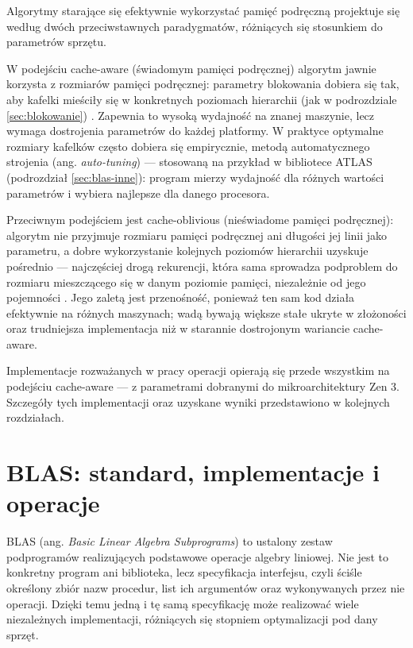 \documentclass[a4paper,12pt]{book} %
\begin{document}
Algorytmy starające się efektywnie wykorzystać pamięć podręczną projektuje się według dwóch przeciwstawnych paradygmatów, różniących się stosunkiem do parametrów sprzętu.

W podejściu cache-aware (świadomym pamięci podręcznej) algorytm jawnie korzysta z rozmiarów pamięci podręcznej: parametry blokowania dobiera się tak, aby kafelki mieściły się w konkretnych poziomach hierarchii (jak w podrozdziale \ref{sec:blokowanie}) \cite{goto2008anatomy}. Zapewnia to wysoką wydajność na znanej maszynie, lecz wymaga dostrojenia parametrów do każdej platformy. W praktyce optymalne rozmiary kafelków często dobiera się empirycznie, metodą automatycznego strojenia (ang. \emph{auto-tuning}) --- stosowaną na przykład w bibliotece ATLAS \cite{whaley2001atlas} (podrozdział \ref{sec:blas-inne}): program mierzy wydajność dla różnych wartości parametrów i wybiera najlepsze dla danego procesora.

Przeciwnym podejściem jest cache-oblivious (nieświadome pamięci podręcznej): algorytm nie przyjmuje rozmiaru pamięci podręcznej ani długości jej linii jako parametru, a dobre wykorzystanie kolejnych poziomów hierarchii uzyskuje pośrednio --- najczęściej drogą rekurencji, która sama sprowadza podproblem do rozmiaru mieszczącego się w danym poziomie pamięci, niezależnie od jego pojemności \cite{frigo1999cacheoblivious}. Jego zaletą jest przenośność, ponieważ ten sam kod działa efektywnie na różnych maszynach; wadą bywają większe stałe ukryte w złożoności oraz trudniejsza implementacja niż w starannie dostrojonym wariancie cache-aware.

Implementacje rozważanych w pracy operacji opierają się przede wszystkim na podejściu cache-aware --- z parametrami dobranymi do mikroarchitektury Zen 3. Szczegóły tych implementacji oraz uzyskane wyniki przedstawiono w kolejnych rozdziałach.

\chapter{BLAS: standard, implementacje i operacje}
\label{chap:blas}

BLAS (ang. \emph{Basic Linear Algebra Subprograms}) to ustalony zestaw podprogramów realizujących podstawowe operacje algebry liniowej. Nie jest to konkretny program ani biblioteka, lecz specyfikacja interfejsu, czyli ściśle określony zbiór nazw procedur, list ich argumentów oraz wykonywanych przez nie operacji. Dzięki temu jedną i tę samą specyfikację może realizować wiele niezależnych implementacji, różniących się stopniem optymalizacji pod dany sprzęt.
\end{document}
